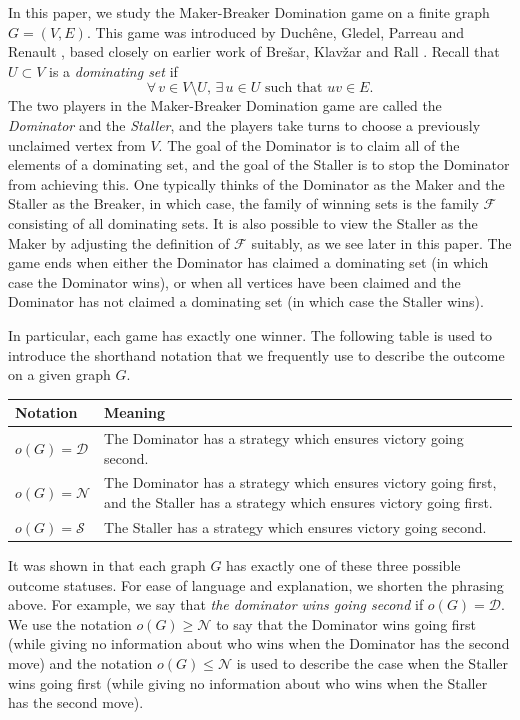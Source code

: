 \documentclass[a4paper,11pt,oneside]{scrartcl}
\theoremstyle{definition}
\theoremstyle{remark}
\begin{document}
In this paper, we study the Maker-Breaker Domination game on a finite graph $G=(V,E)$. This game was introduced by Duchêne, Gledel, Parreau and Renault \cite{DGPR}, based closely on earlier work of Bre\v{s}ar, Klav\v{z}ar and Rall \cite{BKR}. Recall that $U \subset V$ is a \textit{dominating set} if
\[
    \forall \, v \in V \setminus U, \, \exists \, u \in U \text{ such that } uv \in E.
\]
The two players in the Maker-Breaker Domination game are called the \textit{Dominator} and the \textit{Staller}, and the players take turns to choose a previously unclaimed vertex from $V$. The goal of the Dominator is to claim all of the elements of a dominating set, and the goal of the Staller is to stop the Dominator from achieving this. One typically thinks of the Dominator as the Maker and the Staller as the Breaker, in which case, the family of winning sets is the family $\mathcal F$ consisting of all dominating sets. It is also possible to view the Staller as the Maker by adjusting the definition of $\mathcal F$ suitably, as we see later in this paper. The game ends when either the Dominator has claimed a dominating set (in which case the Dominator wins), or when all vertices have been claimed and the Dominator has not claimed a dominating set (in which case the Staller wins). 

In particular, each game has exactly one winner. The following table is used to introduce the shorthand notation that we frequently use to describe the outcome on a given graph $G$.
\begin{center}
    \begin{tabular}{p{2cm}p{11cm}}
        \toprule
        Notation & Meaning \\
        \midrule
        $o(G)= \mathcal D$ & The Dominator has a strategy which ensures victory going second. \\
        $o(G)= \mathcal N$ & The Dominator has a strategy which ensures victory going first, and the Staller has a strategy which ensures victory going first. \\
        $o(G)= \mathcal S$ & The Staller has a strategy which ensures victory going second. \\
        \bottomrule
    \end{tabular}
\end{center}

It was shown in \cite{DGPR} that each graph $G$ has exactly one of these three possible outcome statuses. For ease of language and explanation, we shorten the phrasing above. For example, we say that \textit{the dominator wins going second} if $o(G)= \mathcal D$. We use the notation $o(G) \geq \mathcal N$ to say that the Dominator wins going first (while giving no information about who wins when the Dominator has the second move) and the notation $o(G) \leq \mathcal N$ is used to describe the case when the Staller wins going first (while giving no information about who wins when the Staller has the second move).
\end{document}
